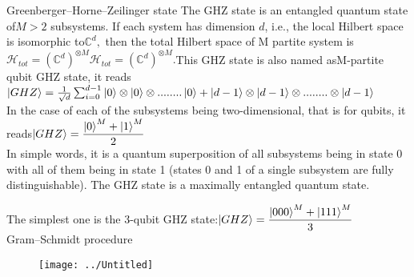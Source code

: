 \documentclass[a4paper,12pt]{article}
\begin{document}
Greenberger–Horne–Zeilinger state
The GHZ state is an entangled quantum state of$ M > 2$ subsystems. If each system has dimension ${\displaystyle d}$, i.e., the local Hilbert space is isomorphic to$ {\displaystyle \mathbb {C} ^{d}},$ then the total Hilbert space of M partite system is 
${\displaystyle {\mathcal {H}}_{tot}=(\mathbb {C} ^{d})^{\otimes M}}{\displaystyle {\mathcal {H}}_{tot}=(\mathbb {C} ^{d})^{\otimes M}}. $This GHZ state is also named asM-partite qubit GHZ state, it reads\\
$ \ket{GHZ}=\frac{1}{\surd d}\sum_{i=0}^{d-1} \ket{0}\otimes\ket{0}\otimes........\ket{0}+\ket{d-1} \otimes\ket{d-1}\otimes........\otimes\ket{d-1}$
\\
In the case of each of the subsystems being two-dimensional, that is for qubits, it reads$ \ket{GHZ}=\dfrac{\ket{0}^{M}+\ket{1}^{M}}{2} $\\
In simple words, it is a quantum superposition of all subsystems being in state 0 with all of them being in state 1 (states 0 and 1 of a single subsystem are fully distinguishable). The GHZ state is a maximally entangled quantum state.

The simplest one is the 3-qubit GHZ state:$ \ket{GHZ}=\dfrac{\ket{000}^{M}+\ket{111}^{M}}{3} $\
\\
Gram–Schmidt procedure\\
\begin{figure}[h!]
\texttt{[image: ../Untitled]}
\caption{}
\label{fig:untitled}
\end{figure}
\end{document}
